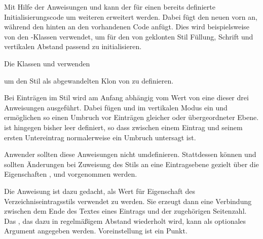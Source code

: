 Mit Hilfe der Anweisungen  und
 kann der für einen  bereits
definierte Initialisierungscode um weiteren 
erweitert werden. Dabei fügt  den neuen
 vorn an, während  den
 hinten an den vorhandenen Code anfügt. Dies wird
beispielsweise von den \KOMAScript-Klassen verwendet, um für den von
 geklonten Stil  Füllung, Schrift und vertikalen
Abstand passend zu initialisieren.
\begin{Example}
Die Klassen  und
 verwenden
\begin{lstcode}
  \TOCEntryStyleStartInitCode{section}{%
    \expandafter\providecommand%
    \csname scr@tso@#1@linefill\endcsname
    {\TOCLineLeaderFill\relax}%
  }
\end{lstcode}
um den Stil  als abgewandelten Klon von  zu
definieren.%
\end{Example}%
\EndIndexGroup
\ExampleEndFix


\begin{Declaration}
\end{Declaration}
Bei Einträgen im Stil
 wird am Anfang abhängig vom Wert von
 eine dieser drei Anweisungen
ausgeführt. Dabei fügen  und
 im vertikalen Modus
 ein und ermöglichen so
einen Umbruch vor Einträgen gleicher oder übergeordneter
Ebene.  ist hingegen bisher leer definiert, so
dass zwischen einem Eintrag und seinem ersten Untereintrag normalerweise ein
Umbruch untersagt ist.

Anwender sollten diese Anweisungen nicht umdefinieren. Stattdessen können und
sollten Änderungen bei Zuweisung des Stils an eine Eintragsebene gezielt über
die Eigenschaften ,  und
 vorgenommen werden.%
\EndIndexGroup


\begin{Declaration}
\end{Declaration}
Die Anweisung ist dazu gedacht,
als Wert für Eigenschaft  des Verzeichniseintragsstils
 verwendet zu werden. Sie erzeugt dann eine Verbindung zwischen
dem Ende des Textes eines Eintrags und der zugehörigen Seitenzahl. Das
, das dazu in regelmäßigem Abstand wiederholt wird, kann
als optionales Argument angegeben werden. Voreinstellung ist ein
Punkt.

